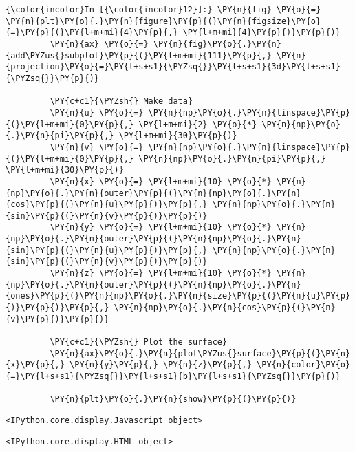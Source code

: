     \begin{Verbatim}[commandchars=\\\{\},frame=single,framerule=0.3mm,rulecolor=\color{cellframecolor}]
{\color{incolor}In [{\color{incolor}12}]:} \PY{n}{fig} \PY{o}{=} \PY{n}{plt}\PY{o}{.}\PY{n}{figure}\PY{p}{(}\PY{n}{figsize}\PY{o}{=}\PY{p}{(}\PY{l+m+mi}{4}\PY{p}{,} \PY{l+m+mi}{4}\PY{p}{)}\PY{p}{)}
         \PY{n}{ax} \PY{o}{=} \PY{n}{fig}\PY{o}{.}\PY{n}{add\PYZus{}subplot}\PY{p}{(}\PY{l+m+mi}{111}\PY{p}{,} \PY{n}{projection}\PY{o}{=}\PY{l+s+s1}{\PYZsq{}}\PY{l+s+s1}{3d}\PY{l+s+s1}{\PYZsq{}}\PY{p}{)}
         
         \PY{c+c1}{\PYZsh{} Make data}
         \PY{n}{u} \PY{o}{=} \PY{n}{np}\PY{o}{.}\PY{n}{linspace}\PY{p}{(}\PY{l+m+mi}{0}\PY{p}{,} \PY{l+m+mi}{2} \PY{o}{*} \PY{n}{np}\PY{o}{.}\PY{n}{pi}\PY{p}{,} \PY{l+m+mi}{30}\PY{p}{)}
         \PY{n}{v} \PY{o}{=} \PY{n}{np}\PY{o}{.}\PY{n}{linspace}\PY{p}{(}\PY{l+m+mi}{0}\PY{p}{,} \PY{n}{np}\PY{o}{.}\PY{n}{pi}\PY{p}{,} \PY{l+m+mi}{30}\PY{p}{)}
         \PY{n}{x} \PY{o}{=} \PY{l+m+mi}{10} \PY{o}{*} \PY{n}{np}\PY{o}{.}\PY{n}{outer}\PY{p}{(}\PY{n}{np}\PY{o}{.}\PY{n}{cos}\PY{p}{(}\PY{n}{u}\PY{p}{)}\PY{p}{,} \PY{n}{np}\PY{o}{.}\PY{n}{sin}\PY{p}{(}\PY{n}{v}\PY{p}{)}\PY{p}{)}
         \PY{n}{y} \PY{o}{=} \PY{l+m+mi}{10} \PY{o}{*} \PY{n}{np}\PY{o}{.}\PY{n}{outer}\PY{p}{(}\PY{n}{np}\PY{o}{.}\PY{n}{sin}\PY{p}{(}\PY{n}{u}\PY{p}{)}\PY{p}{,} \PY{n}{np}\PY{o}{.}\PY{n}{sin}\PY{p}{(}\PY{n}{v}\PY{p}{)}\PY{p}{)}
         \PY{n}{z} \PY{o}{=} \PY{l+m+mi}{10} \PY{o}{*} \PY{n}{np}\PY{o}{.}\PY{n}{outer}\PY{p}{(}\PY{n}{np}\PY{o}{.}\PY{n}{ones}\PY{p}{(}\PY{n}{np}\PY{o}{.}\PY{n}{size}\PY{p}{(}\PY{n}{u}\PY{p}{)}\PY{p}{)}\PY{p}{,} \PY{n}{np}\PY{o}{.}\PY{n}{cos}\PY{p}{(}\PY{n}{v}\PY{p}{)}\PY{p}{)}
         
         \PY{c+c1}{\PYZsh{} Plot the surface}
         \PY{n}{ax}\PY{o}{.}\PY{n}{plot\PYZus{}surface}\PY{p}{(}\PY{n}{x}\PY{p}{,} \PY{n}{y}\PY{p}{,} \PY{n}{z}\PY{p}{,} \PY{n}{color}\PY{o}{=}\PY{l+s+s1}{\PYZsq{}}\PY{l+s+s1}{b}\PY{l+s+s1}{\PYZsq{}}\PY{p}{)}
         
         \PY{n}{plt}\PY{o}{.}\PY{n}{show}\PY{p}{(}\PY{p}{)}
\end{Verbatim}


    
    \begin{verbatim}
<IPython.core.display.Javascript object>
    \end{verbatim}

    
    
    \begin{verbatim}
<IPython.core.display.HTML object>
    \end{verbatim}

